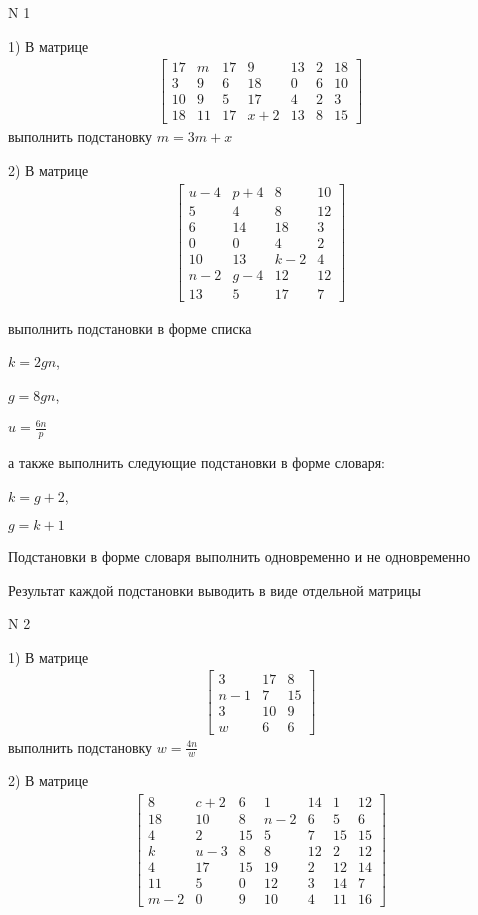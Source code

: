 \documentclass[11pt]{report}
\begin{document}
\pagestyle{empty}

N 1


    1) В матрице
\begin{align*}
\left[\begin{matrix}17 & m & 17 & 9 & 13 & 2 & 18\\3 & 9 & 6 & 18 & 0 & 6 & 10\\10 & 9 & 5 & 17 & 4 & 2 & 3\\18 & 11 & 17 & x + 2 & 13 & 8 & 15\end{matrix}\right]
\end{align*}
выполнить подстановку $m=3 m + x$


    2) В матрице
\begin{align*}
\left[\begin{matrix}u - 4 & p + 4 & 8 & 10\\5 & 4 & 8 & 12\\6 & 14 & 18 & 3\\0 & 0 & 4 & 2\\10 & 13 & k - 2 & 4\\n - 2 & g - 4 & 12 & 12\\13 & 5 & 17 & 7\end{matrix}\right]
\end{align*}

выполнить подстановки в форме списка

$k=2 g n$,

$g=8 g n$,

$u=\frac{6 n}{p}$

а также выполнить следующие подстановки в форме словаря:

$k=g + 2$,

$g=k + 1$


    Подстановки в форме словаря выполнить одновременно и не одновременно


    Результат каждой подстановки выводить в виде отдельной матрицы

\newpage
N 2


    1) В матрице
\begin{align*}
\left[\begin{matrix}3 & 17 & 8\\n - 1 & 7 & 15\\3 & 10 & 9\\w & 6 & 6\end{matrix}\right]
\end{align*}
выполнить подстановку $w=\frac{4 n}{w}$


    2) В матрице
\begin{align*}
\left[\begin{matrix}8 & c + 2 & 6 & 1 & 14 & 1 & 12\\18 & 10 & 8 & n - 2 & 6 & 5 & 6\\4 & 2 & 15 & 5 & 7 & 15 & 15\\k & u - 3 & 8 & 8 & 12 & 2 & 12\\4 & 17 & 15 & 19 & 2 & 12 & 14\\11 & 5 & 0 & 12 & 3 & 14 & 7\\m - 2 & 0 & 9 & 10 & 4 & 11 & 16\end{matrix}\right]
\end{align*}
\end{document}
